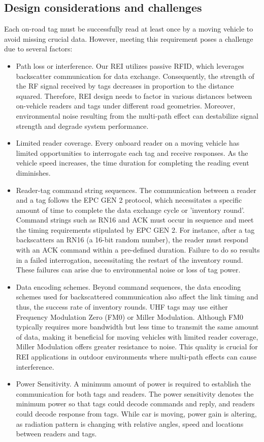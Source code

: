 \documentclass[lettersize,journal]{IEEEtran}
\begin{document}
\subsection{Design considerations and challenges}

Each on-road tag must be successfully read at least once by a moving vehicle to avoid missing crucial data. However, meeting this requirement poses a challenge due to several factors:

\begin{itemize}
    \item Path loss or interference. Our REI utilizes passive RFID, which leverages backscatter communication for data exchange. Consequently, the strength of the RF signal received by tags decreases in proportion to the distance squared. Therefore, REI design needs to factor in various distances between on-vehicle readers and tags under different road geometries. Moreover, environmental noise resulting from the multi-path effect can destabilize signal strength and degrade system performance.
    \item Limited reader coverage. Every onboard reader on a moving vehicle has limited opportunities to interrogate each tag and receive responses. As the vehicle speed increases, the time duration for completing the reading event diminishes.
    \item Reader-tag command string sequences. The communication between a reader and a tag follows the EPC GEN 2 protocol, which necessitates a specific amount of time to complete the data exchange cycle or 'inventory round'. Command strings such as RN16 and ACK must occur in sequence and meet the timing requirements stipulated by EPC GEN 2. For instance, after a tag backscatters an RN16 (a 16-bit random number), the reader must respond with an ACK command within a pre-defined duration. Failure to do so results in a failed interrogation, necessitating the restart of the inventory round. These failures can arise due to environmental noise or loss of tag power.
    \item Data encoding schemes. Beyond command sequences, the data encoding schemes used for backscattered communication also affect the link timing and thus, the success rate of inventory rounds. UHF tags may use either Frequency Modulation Zero (FM0) or Miller Modulation. Although FM0 typically requires more bandwidth but less time to transmit the same amount of data, making it beneficial for moving vehicles with limited reader coverage, Miller Modulation offers greater resistance to noise. This quality is crucial for REI applications in outdoor environments where multi-path effects can cause interference.  \item Power Sensitivity. A minimum amount of power is required to establish the communication for both tags and readers. The power sensitivity denotes the minimum power so that tags could decode commands and reply, and readers could decode response from tags. While car is moving, power gain is altering, as radiation pattern is changing with relative angles, speed and locations between readers and tags. 
\end{itemize}
\end{document}
